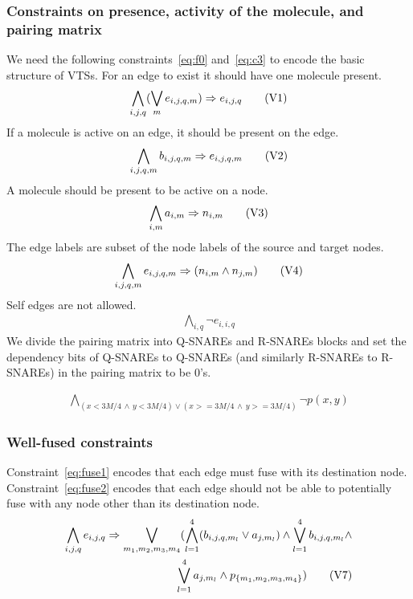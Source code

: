 \subsubsection{Constraints on presence, activity of the molecule, and pairing matrix}
%
We need the following constraints~\eqref{eq:f0} and~\eqref{eq:c3}
to encode the basic structure of VTSs.
%
For an edge to exist it should have one molecule present. 
%
\begin{align}
  \bigwedge\limits_{i,j,q} (\bigvee_m e_{i,j,q,m} )\Rightarrow e_{i,j,q}\tag{V1}\label{eq:f0}
\end{align}
If a molecule is active on an edge, it should be present on the edge.
%
\begin{align}
  \bigwedge\limits_{i,j,q,m} b_{i,j,q,m} \Rightarrow e_{i,j,q,m}\tag{V2}\label{eq:f1}
\end{align}
A molecule should be present to be active on a node.  
\begin{align}
  \bigwedge\limits_{i,m} a_{i,m} \Rightarrow n_{i,m}
  \tag{V3}\label{eq:c4}
\end{align}
The edge labels are subset of the node labels of the source and target nodes.
\begin{align}
  \bigwedge\limits_{i,j,q,m} e_{i,j,q,m} \Rightarrow (n_{i,m} \land n_{j,m} )\tag{V4}\label{eq:c0}
\end{align}
Self edges are not allowed. 
\begin{align}
   \bigwedge\limits_{i,q} \neg e_{i,i,q}\tag{V5}\label{eq:c2}
\end{align}
We divide the pairing matrix into Q-SNAREs and R-SNAREs blocks and set the dependency bits of Q-SNAREs to Q-SNAREs (and similarly R-SNAREs to R-SNAREs) in the pairing matrix to be 0's.

\begin{align}
  \bigwedge\limits_{(x < 3M/4 \, \land  \, y < 3M/4) \lor  (x >= 3M/4 \, \land \, y >= 3M/4)} \neg p(x,y)
  \tag{V6}\label{eq:c3}
\end{align}

\subsubsection{Well-fused constraints}
Constraint~\eqref{eq:fuse1} encodes that each edge must fuse with
its destination node.
%
Constraint~\eqref{eq:fuse2} encodes that each edge should not
be able to potentially fuse with any node other than its destination node.
\begin{align}
  \bigwedge\limits_{i,j,q} e_{i,j,q} \Rightarrow 
\bigvee_{{m_1,m_2,m_3,m_4}} (\bigwedge_{l=1}^4 ( b_{i,j,q,m_l} \lor a_{j,m_l} ) \land
\bigvee\limits_{l=1}^4 b_{i,j,q,m_l} \land
  \notag \\
	\qquad \qquad \qquad \qquad
	\bigvee\limits_{l=1}^4 a_{j,m_l} \land p_{\{m_1,m_2,m_3,m_4\}})
  \tag{V7}\label{eq:fuse1}  
\end{align}

